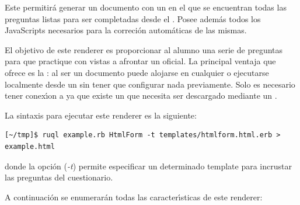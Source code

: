 

Este  permitir\'a generar un documento  con un  en el que se encuentran todas las
preguntas listas para ser completadas desde el . Posee adem\'as todos los JavaScripts necesarios
para la correci\'on autom\'aticas de las mismas.
\bigskip

El objetivo de este renderer es proporcionar al alumno una serie de preguntas para que practique con vistas
a afrontar un  oficial. La principal ventaja que ofrece es la : al ser un documento  puede
alojarse en cualquier  o ejecutarse localmente desde un  sin tener que configurar nada previamente.
Solo es necesario tener conex\'{\i}on a  ya que existe un  que necesita ser descargado mediante 
un \ceis{\ref{apend1:cdn}}.
\bigskip

La sintaxis para ejecutar este renderer es la siguiente:
\begin{verbatim}
[~/tmp]$ ruql example.rb HtmlForm -t templates/htmlform.html.erb > example.html
\end{verbatim}
donde la opci\'on (\textit{-t}) permite especificar un determinado template para incrustar las preguntas del cuestionario.
\bigskip

A continuaci\'on se enumerar\'an todas las caracter\'{\i}sticas de este renderer:

